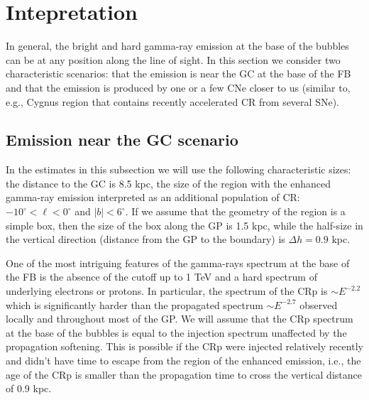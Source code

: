 \section{Intepretation}

In general, the bright and hard gamma-ray emission at the base of the bubbles can be at any position along the line of sight.
In this section we consider two characteristic scenarios: that the emission is near the GC at the base of the FB and that the emission is 
produced by one or a few CNe closer to us (similar to, e.g., Cygnus region that contains recently accelerated CR from several SNe).

\subsection{Emission near the GC scenario}

In the estimates in this subsection we will use the following characteristic sizes: 
the distance to the GC is 8.5 kpc, 
the size of the region with the enhanced gamma-ray emission interpreted as an additional population of CR:
$-10^\circ < \ell < 0^\circ$ and $|b| < 6^\circ$.
If we assume that the geometry of the region is a simple box, then the size of the box along the GP is 1.5 kpc,
while the half-size in the vertical direction (distance from the GP to the boundary) is $\Delta h = 0.9$ kpc.

One of the most intriguing features of the gamma-rays spectrum at the base of the FB is the absence of the cutoff up to 1 TeV and 
a hard spectrum of underlying electrons or protons.
In particular, the spectrum of the CRp is $\sim E^{-2.2}$ which is significantly harder than the propagated spectrum
$\sim E^{-2.7}$ observed locally and throughout most of the GP.
We will assume that the CRp spectrum at the base of the bubbles is equal to the injection spectrum unaffected by the 
propagation softening.
This is possible if the CRp were injected relatively recently and didn't have time to escape from the region of the enhanced emission,
i.e., the age of the CRp is smaller than the propagation time to cross the vertical distance of 0.9 kpc.

